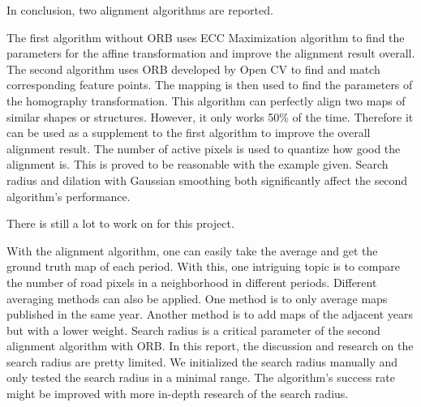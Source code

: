 In conclusion, two alignment algorithms are reported. 

The first algorithm without ORB uses ECC Maximization algorithm to find the parameters for the affine transformation and improve the alignment result overall. The second algorithm uses ORB developed by Open CV to find and match corresponding feature points. The mapping is then used to find the parameters of the homography transformation. This algorithm can perfectly align two maps of similar shapes or structures. However, it only works 50\% of the time. Therefore it can be used as a supplement to the first algorithm to improve the overall alignment result. The number of active pixels is used to quantize how good the alignment is. This is proved to be reasonable with the example given. Search radius and dilation with Gaussian smoothing both significantly affect the second algorithm's performance.

There is still a lot to work on for this project. 

With the alignment algorithm, one can easily take the average and get the ground truth map of each period. With this, one intriguing topic is to compare the number of road pixels in a neighborhood in different periods. Different averaging methods can also be applied. One method is to only average maps published in the same year. Another method is to add maps of the adjacent years but with a lower weight. Search radius is a critical parameter of the second alignment algorithm with ORB. In this report, the discussion and research on the search radius are pretty limited. We initialized the search radius manually and only tested the search radius in a minimal range. The algorithm's success rate might be improved with more in-depth research of the search radius.